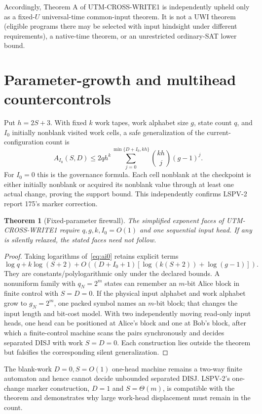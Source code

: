 \documentclass[11pt]{article}
\newtheorem{theorem}{Theorem}
\begin{document}
Accordingly, Theorem A of UTM-CROSS-WRITE1 is independently upheld only as a fixed-$U$ universal-time common-input theorem.  It is not a UWI theorem (eligible programs there may be selected with input hindsight under different requirements), a native-time theorem, or an unrestricted ordinary-SAT lower bound.

\section{Parameter-growth and multihead countercontrols}
Put $h=2S+3$.  With fixed $k$ work tapes, work alphabet size $g$, state count $q$, and $I_0$ initially nonblank visited work cells, a safe generalization of the current-configuration count is
\begin{equation}\label{eq:ai0}
A_{I_0}(S,D)\le 2q h^k
\sum_{j=0}^{\min\{D+I_0,kh\}}{kh\choose j}(g-1)^j.
\end{equation}
For $I_0=0$ this is the governance formula.  Each cell nonblank at the checkpoint is either initially nonblank or acquired its nonblank value through at least one actual change, proving the support bound.  This independently confirms LSPV-2 report 175's marker correction.

\begin{theorem}[Fixed-parameter firewall]\label{th:params}
The simplified exponent faces of UTM-CROSS-WRITE1 require $q,g,k,I_0=O(1)$ and one sequential input head.  If any is silently relaxed, the stated faces need not follow.
\end{theorem}
\begin{proof}
Taking logarithms of~\eqref{eq:ai0} retains explicit terms
\[
\log q+k\log(S+2)+O\!\left((D+I_0+1)
  [\log(k(S+2))+\log(g-1)]\right).
\]
They are constants/polylogarithmic only under the declared bounds.  A nonuniform family with $q_N=2^m$ states can remember an $m$-bit Alice block in finite control with $S=D=0$.  If the physical input alphabet and work alphabet grow to $g_N=2^m$, one packed symbol names an $m$-bit block; that changes the input length and bit-cost model.  With two independently moving read-only input heads, one head can be positioned at Alice's block and one at Bob's block, after which a finite-control machine scans the pairs synchronously and decides separated DISJ with work $S=D=0$.  Each construction lies outside the theorem but falsifies the corresponding silent generalization.
\end{proof}

The blank-work $D=0,S=O(1)$ one-head machine remains a two-way finite automaton and hence cannot decide unbounded separated DISJ.  LSPV-2's one-change marker construction, $D=1$ and $S=\Theta(m)$, is compatible with the theorem and demonstrates why large work-head displacement must remain in the count.
\end{document}
